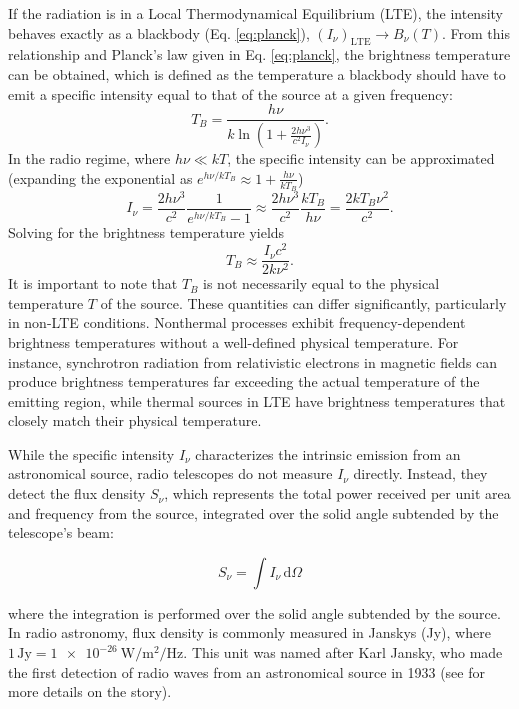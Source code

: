 If the radiation is in a Local Thermodynamical Equilibrium (LTE), the intensity behaves exactly as a blackbody (Eq. \ref{eq:planck}), $(I_\nu)_{\text{LTE}} \rightarrow B_\nu(T)$.
From this relationship and Planck's law given in Eq. \ref{eq:planck}, the brightness temperature can be obtained, which is defined as the temperature a blackbody should have to emit a specific intensity equal to that of the source at a given frequency:
\begin{equation}
	T_B = \frac{h\nu}{k \ln\left(1 + \frac{2h\nu^3}{c^2I_\nu}\right)}.
\end{equation}
In the radio regime, where $h\nu \ll kT$, the specific intensity can be approximated (expanding the exponential as $e^{h\nu/kT_B} \approx 1 + \frac{h\nu}{kT_B}$)
\begin{equation}
	I_\nu = \frac{2h\nu^3}{c^2} \frac{1}{e^{h\nu/kT_B}-1} \approx \frac{2h\nu^3}{c^2} \frac{kT_B}{h\nu} = \frac{2kT_B\nu^2}{c^2}.
\end{equation}
Solving for the brightness temperature yields
\begin{equation}
	T_B \approx \frac{I_\nu c^2}{2k\nu^2}.
\end{equation}
It is important to note that $T_B$ is not necessarily equal to the physical temperature $T$ of the source. These quantities can differ significantly, particularly in non-LTE conditions. Nonthermal processes exhibit frequency-dependent brightness temperatures without a well-defined physical temperature. For instance, synchrotron radiation from relativistic electrons in magnetic fields can produce brightness temperatures far exceeding the actual temperature of the emitting region, while thermal sources in LTE have brightness temperatures that closely match their physical temperature.

While the specific intensity $I_\nu$ characterizes the intrinsic emission from an astronomical source, radio telescopes do not measure $I_\nu$ directly. Instead, they detect the flux density $S_\nu$, which represents the total power received per unit area and frequency from the source, integrated over the solid angle subtended by the telescope's beam:

\begin{equation}
	S_\nu = \int I_\nu \, \mathrm{d}\Omega
\end{equation}

where the integration is performed over the solid angle subtended by the source. In radio astronomy, flux density is commonly measured in Janskys (Jy), where $1\,\mathrm{Jy} = \SI{1e-26}{\watt \per \meter \squared \per \hertz}$. This unit was named after Karl Jansky, who made the first detection of radio waves from an astronomical source in 1933 (see \citealt{Sullivan_1984} for more details on the story).

